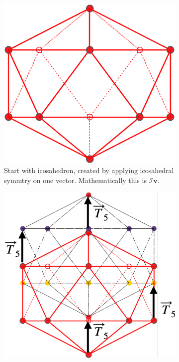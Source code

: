 \documentclass[a4paper,10pt]{article}
\theoremstyle{plain}
\theoremstyle{definition}
\theoremstyle{remark}
\renewcommand{\vec}[1]{\mathbf{#1}}
\begin{document}
\begin{figure}[h!]
	\centering
	\begin{subfigure}{0.25\textwidth}
		\centering
		\includegraphics[width=\textwidth]{images/p_arr_construction_1.pdf}
		\caption{Start with icosahedron, created by applying icosahedral symmtry on one vector. Mathematically this is \(\mathcal{I}\vec{v}\).}
	\end{subfigure}
	\hfill
	\begin{subfigure}{0.3\textwidth}
		\centering
		\includegraphics[width=\textwidth]{images/p_arr_construction_2.pdf}

\end{subfigure}
\end{figure}
\end{document}
